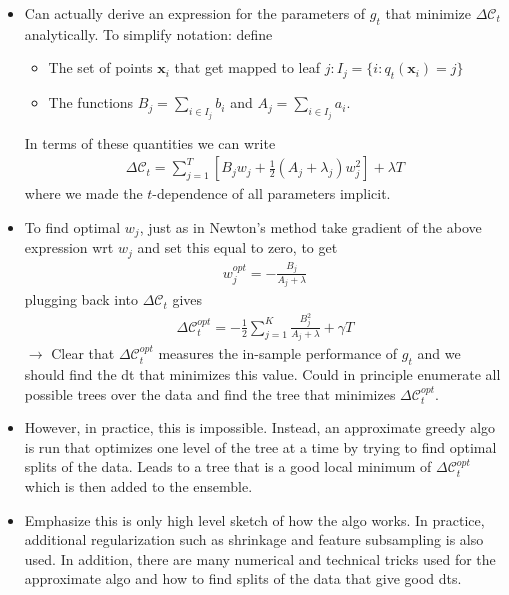 \documentclass[norsk,a4paper,11pt]{article}
\begin{document}
\begin{itemize}
	\item Can actually derive an expression for the parameters of $g_t$ that minimize $\Delta \mathcal{C}_t$ analytically. To simplify notation: define
	\begin{itemize} 
		\item The set of points $\bm{x}_i$ that get mapped to leaf $j: I_j = \{ i : q_t(\bm{x}_i) = j \}$
		\item The functions $B_j = \sum_{i\in I_j} b_i$ and $A_j = \sum_{i\in I_j} a_i$. 
	\end{itemize}
	In terms of these quantities we can write 
	\begin{align}
		\Delta \mathcal{C}_t = \sum_{j=1}^T [B_j w_j + \frac{1}{2} (A_j + \lambda_j) w_j^2] + \lambda T
	\end{align}
	where we made the $t$-dependence of all parameters implicit. 
	\item To find optimal $w_j$, just as in Newton's method take gradient of the above expression wrt $w_j$ and set this equal to zero, to get
	\begin{align}
		w_j^{opt} = - \frac{B_j}{A_j + \lambda}
	\end{align}
	plugging back into $\Delta \mathcal{C}_t$ gives
	\begin{align}
		\Delta \mathcal{C}_t^{opt} = -\frac{1}{2} \sum_{j=1}^K \frac{B_j^2}{A_j + \lambda } + \gamma T
	\end{align}
	$\rightarrow$ Clear that $\Delta \mathcal{C}_t^{opt}$ measures the in-sample performance of $g_t$ and we should find the dt that minimizes this value. Could in principle enumerate all possible trees over the data and find the tree that minimizes $\Delta \mathcal{C}_t^{opt}$.
	\item However, in practice, this is impossible. Instead, an approximate greedy algo is run that optimizes one level of the tree at a time by trying to find optimal splits of the data. Leads to a tree that is a good local minimum of $\Delta \mathcal{C}_t^{opt}$ which is then added to the ensemble. 
	\item Emphasize this is only high level sketch of how the algo works. In practice, additional regularization such as shrinkage and feature subsampling is also used. In addition, there are many numerical and technical tricks used for the approximate algo and how to find splits of the data that give good dts.
\end{itemize}
\end{document}
